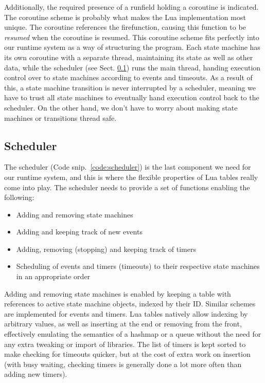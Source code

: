 Additionally, the required presence of a \guillemotleft run\guillemotright  field holding a coroutine is indicated. The coroutine scheme is probably what makes the Lua implementation most unique. The coroutine references the \guillemotleft fire\guillemotright  function, causing this function to be \emph{resumed} when the coroutine is resumed. This coroutine scheme fits perfectly into our runtime system as a way of structuring the program. Each state machine has its own coroutine with a separate thread, maintaining its state as well as other data, while the scheduler (see Sect. \ref{sec:impl_sched}) runs the main thread, handing execution control over to state machines according to events and timeouts. As a result of this, a state machine transition is never interrupted by a scheduler, meaning we have to trust all state machines to eventually hand execution control back to the scheduler. On the other hand, we don't have to worry about making state machines or transitions \guillemotleft thread safe\guillemotright .

\subsection{Scheduler}
\label{sec:impl_sched}
The scheduler (Code snip.~\ref{code:scheduler}) is the last component we need for our runtime system, and this is where the flexible properties of Lua tables really come into play. The scheduler needs to provide a set of functions enabling the following:

\begin{itemize}
	\item Adding and removing state machines
	\item Adding and keeping track of new events
	\item Adding, removing (stopping) and keeping track of timers
	\item Scheduling of events and timers (timeouts) to their respective state machines in an appropriate order
\end{itemize}

Adding and removing state machines is enabled by keeping a table with references to active state machine objects, indexed by their ID. Similar schemes are implemented for events and timers. Lua tables natively allow indexing by arbitrary values, as well as inserting at the end or removing from the front, effectively emulating the semantics of a hashmap or a queue without the need for any extra tweaking or import of libraries. The list of timers is kept sorted to make checking for timeouts quicker, but at the cost of extra work on insertion (with busy waiting, checking timers is generally done a lot more often than adding new timers).

